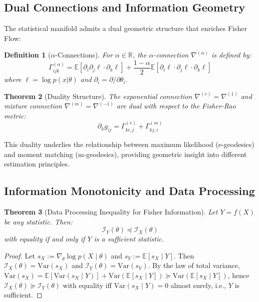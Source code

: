 \documentclass[11pt]{article}
\newtheorem{theorem}{Theorem}
\newtheorem{definition}[theorem]{Definition}
\begin{document}
\subsection{Dual Connections and Information Geometry}

The statistical manifold admits a dual geometric structure that enriches Fisher Flow:

\begin{definition}[$\alpha$-Connections]
For $\alpha \in \mathbb{R}$, the $\alpha$-connection $\nabla^{(\alpha)}$ is defined by:
\begin{equation}
\Gamma_{ijk}^{(\alpha)} = \mathbb{E}\left[\partial_i \partial_j \ell \cdot \partial_k \ell\right] + \frac{1-\alpha}{2}\mathbb{E}\left[\partial_i \ell \cdot \partial_j \ell \cdot \partial_k \ell\right]
\end{equation}
where $\ell = \log p(x|\theta)$ and $\partial_i = \partial/\partial\theta_i$.
\end{definition}

\begin{theorem}[Duality Structure]
The exponential connection $\nabla^{(e)} = \nabla^{(1)}$ and mixture connection $\nabla^{(m)} = \nabla^{(-1)}$ are dual with respect to the Fisher-Rao metric:
\begin{equation}
\partial_k g_{ij} = \Gamma_{ki,j}^{(e)} + \Gamma_{kj,i}^{(m)}
\end{equation}
\end{theorem}

This duality underlies the relationship between maximum likelihood (e-geodesics) and moment matching (m-geodesics), providing geometric insight into different estimation principles.

\subsection{Information Monotonicity and Data Processing}

\begin{theorem}[Data Processing Inequality for Fisher Information]
\label{thm:data_processing}
Let $Y = f(X)$ be any statistic. Then:
\begin{equation}
\mathcal{I}_Y(\theta) \preceq \mathcal{I}_X(\theta)
\end{equation}
with equality if and only if $Y$ is a sufficient statistic.
\end{theorem}

\begin{proof}
Let $s_X := \nabla_\theta \log p(X\mid\theta)$ and $s_Y := \mathbb E[s_X\mid Y]$. Then $\mathcal I_X(\theta)=\mathrm{Var}(s_X)$ and $\mathcal I_Y(\theta)=\mathrm{Var}(s_Y)$. By the law of total variance, $\mathrm{Var}(s_X) = \mathbb E[\mathrm{Var}(s_X\mid Y)] + \mathrm{Var}(\mathbb E[s_X\mid Y]) \succeq \mathrm{Var}(\mathbb E[s_X\mid Y])$, hence $\mathcal I_X(\theta) \succeq \mathcal I_Y(\theta)$ with equality iff $\mathrm{Var}(s_X\mid Y)=0$ almost surely, i.e., $Y$ is sufficient.
\end{proof}
\end{document}
